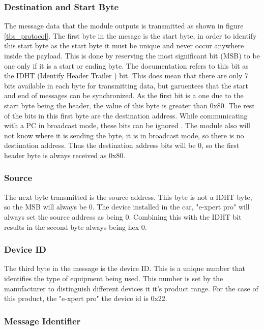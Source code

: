 \subsubsection{Destination and Start Byte}

The message data that the module outputs is transmitted as shown in figure \ref{tbs_protocol}. The first byte in the mesage is the start byte, in order to identify this start byte as the start byte it must be unique and never occur anywhere inside the payload. This is done by reserving the most significant bit (MSB) to be one only if it is a start or ending byte. The documentation refers to this bit as the IDHT (Identify Header Trailer ) bit. This does mean that there are only 7 bits available in each byte for transmitting data, but garuentees that the start and end of messages can be synchronized. As the first bit is a one due to the start byte being the header, the value of this byte is greater than 0x80. The rest of the bits in this first byte are the destination address. While communicating with a PC in broadcast mode, these bits can be ignored \cite{e_xpert}. The module also will not know where it is sending the byte, it is in broadcast mode, so there is no destination address. Thus the destination address bits will be 0, so the first header byte is always received as 0x80.

\subsubsection{Source}

The next byte transmitted is the source address. This byte is not a IDHT byte, so the MSB will always be 0. The device installed in the car, "e-xpert pro" will always set the source address as being 0. Combining this with the IDHT bit results in the second byte always being hex 0.

\subsubsection{Device ID}

The third byte in the message is the device ID. This is a unique number that identifies the type of equipment being used. This number is set by the manufacturer to distinguish different devices it it's product range. For the case of this product, the "e-xpert pro" the device id is 0x22.

\subsubsection{Message Identifier}

